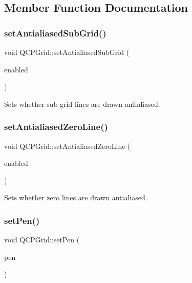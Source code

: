 \subsection{Member Function Documentation}
\mbox{\label{class_q_c_p_grid_a5692310ba183721a413d60951407d114}} 
\subsubsection{\texorpdfstring{set\+Antialiased\+Sub\+Grid()}{setAntialiasedSubGrid()}}
{\footnotesize\ttfamily void Q\+C\+P\+Grid\+::set\+Antialiased\+Sub\+Grid (\begin{DoxyParamCaption}\item[{bool}]{enabled }\end{DoxyParamCaption})}

Sets whether sub grid lines are drawn antialiased. \mbox{\label{class_q_c_p_grid_a3cc6d54647393ee71afb6da56af07aa4}} 
\subsubsection{\texorpdfstring{set\+Antialiased\+Zero\+Line()}{setAntialiasedZeroLine()}}
{\footnotesize\ttfamily void Q\+C\+P\+Grid\+::set\+Antialiased\+Zero\+Line (\begin{DoxyParamCaption}\item[{bool}]{enabled }\end{DoxyParamCaption})}

Sets whether zero lines are drawn antialiased. \mbox{\label{class_q_c_p_grid_aa05ab9816ffb440908171e45e833b593}} 
\subsubsection{\texorpdfstring{set\+Pen()}{setPen()}}
{\footnotesize\ttfamily void Q\+C\+P\+Grid\+::set\+Pen (\begin{DoxyParamCaption}\item[{const Q\+Pen \&}]{pen }\end{DoxyParamCaption})}

